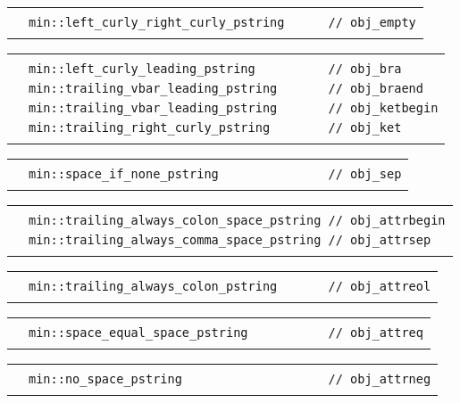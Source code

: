 \documentclass[12pt]{article}
\newenvironment{indpar}[1][0.3in]%
	{\begin{list}{}%
		     {\setlength{\itemsep}{0in}%
		      \setlength{\topsep}{0in}%
		      \setlength{\parsep}{1ex}%
		      \setlength{\labelwidth}{#1}%
		      \setlength{\leftmargin}{#1}%
		      \addtolength{\leftmargin}{\labelsep}}%
	 \item}%
	{\end{list}}
\newlength{\ARGBREAKLENGTH}
\newcommand{\ARGBREAK}[1][\ARGBREAKLENGTH]{\\&\hspace*{#1}}
\begin{document}
\begin{indpar}[1em]
\vspace{-4ex}\begin{tabular}{r@{}l}\hspace*{0.1in}\ARGBREAK
\verb|min::left_curly_right_curly_pstring      // obj_empty|\ARGBREAK
\end{tabular}

\vspace{-4ex}\begin{tabular}{r@{}l}\hspace*{0.1in}\ARGBREAK
\verb|min::left_curly_leading_pstring          // obj_bra|\ARGBREAK
\verb|min::trailing_vbar_leading_pstring       // obj_braend|\ARGBREAK
\verb|min::trailing_vbar_leading_pstring       // obj_ketbegin|\ARGBREAK
\verb|min::trailing_right_curly_pstring        // obj_ket|\ARGBREAK
\end{tabular}

\vspace{-4ex}\begin{tabular}{r@{}l}\hspace*{0.1in}\ARGBREAK
\verb|min::space_if_none_pstring               // obj_sep|\ARGBREAK
\end{tabular}

\vspace{-4ex}\begin{tabular}{r@{}l}\hspace*{0.1in}\ARGBREAK
\verb|min::trailing_always_colon_space_pstring // obj_attrbegin|\ARGBREAK
\verb|min::trailing_always_comma_space_pstring // obj_attrsep|\ARGBREAK
\end{tabular}

\vspace{-4ex}\begin{tabular}{r@{}l}\hspace*{0.1in}\ARGBREAK
\verb|min::trailing_always_colon_pstring       // obj_attreol|\ARGBREAK
\end{tabular}

\vspace{-4ex}\begin{tabular}{r@{}l}\hspace*{0.1in}\ARGBREAK
\verb|min::space_equal_space_pstring           // obj_attreq|\ARGBREAK
\end{tabular}

\vspace{-4ex}\begin{tabular}{r@{}l}\hspace*{0.1in}\ARGBREAK
\verb|min::no_space_pstring                    // obj_attrneg|\ARGBREAK
\end{tabular}


\end{indpar}
\end{document}
